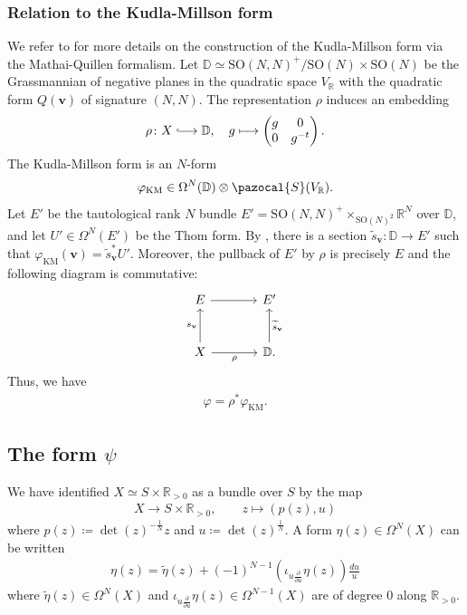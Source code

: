 \documentclass[a4paper,11pt]{amsart} %
\newcommand{\iotau}{\iota_{u\frac{\partial}{\partial u}}}
\newcommand{\8}{\infty}
\newcommand{\vbf}{\mathbf{v}}
\newcommand{\SO}{\mathrm{SO}}
\newcommand{\KM}{\mathrm{KM}}
\newcommand{\D}{\mathbb{D}}
\newcommand{\R}{\mathbb{R}}
\newcommand{\Scal}{\pazocal{S}}
\newcommand{\hooklongrightarrow}{\lhook\joinrel\longrightarrow}
\newcommand{\etatil}{\widetilde{\eta}}
\theoremstyle{mytheoremstyle}
\theoremstyle{remark}
\numberwithin{equation}{section}
\begin{document}
\subsubsection{Relation to the Kudla-Millson form} \label{relation kudla millson}
We refer to \cite{rbrkmmq} for more details on the construction of the Kudla-Millson form via the Mathai-Quillen formalism. Let $\D \simeq \SO(N,N)^+/\SO(N)\times \SO(N)$ be the Grassmannian of negative planes in the quadratic space $V_\R$ with the quadratic form $Q(\vbf)$ of signature $(N,N)$. The representation $\rho$ induces an embedding
\begin{align}
\rho \colon X \hooklongrightarrow \D, \quad g \longmapsto \begin{pmatrix}
g & 0 \\ 0& g^{-t}
\end{pmatrix}.
\end{align}
The Kudla-Millson form is an $N$-form
\begin{align}
\varphi_{\KM} \in \Omega^{N}(\D) \otimes \Scal(V_\R).
\end{align}
Let $E'$ be the tautological rank $N$ bundle $E'=\SO(N,N)^+\times_{\SO(N)^2}\R^N$ over $\D$, and let $U' \in \Omega^N(E')$ be the Thom form. By \cite{rbrkmmq}, there is a section $\widetilde{s}_\vbf \colon \D \longrightarrow E'$ such that $\varphi_{\KM}(\vbf)=\widetilde{s}_\vbf^\ast U'$. Moreover, the pullback of $E'$ by $\rho$ is precisely $E$ and the following diagram is commutative:
\begin{equation}
\begin{tikzcd}[column sep=large,row sep=large]
E \arrow[r] & E'  \\
X \arrow[u, "s_\vbf"] \arrow[r, swap, "\rho"] & \D \arrow[u, swap, "\widetilde{s}_\vbf"].
\end{tikzcd}
\end{equation}
Thus, we have
\begin{align}
\varphi=\rho^\ast \varphi_{\KM}.
\end{align}

\subsection{The form $\psi$}\label{sec:psiform}

We have identified $X \simeq S \times \R_{>0}$ as a bundle over $S$ by the map
\begin{align}
    X \longrightarrow S \times \R_{>0}, \qquad z \longmapsto \left ( p(z), u\right )
\end{align}
where $p(z) \coloneqq \det(z)^{-\frac{1}{N}} z$ and $u\coloneqq \det(z)^{\frac{1}{N}}$. A form $\eta(z) \in \Omega^N(X)$ can be written
\begin{align}
\eta(z)=\etatil(z) + (-1)^{N-1} \left ( \iotau\eta(z) \right )\frac{du}{u}
\end{align}
where $\etatil(z) \in \Omega^N(X)$ and  $\iotau \eta(z) \in \Omega^{N-1}(X)$ are of degree $0$ along $\R_{>0}$.
 
\end{document}
